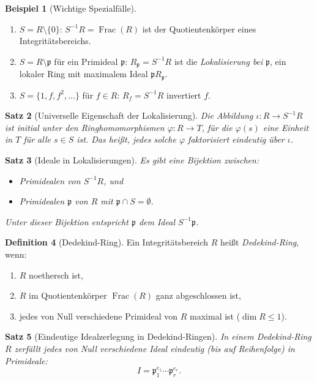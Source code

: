 \documentclass[12pt,a4paper]{amsart}
\newtheorem{theorem}{Satz}[section]
\theoremstyle{definition}
\newtheorem{definition}[theorem]{Definition}
\newtheorem{example}[theorem]{Beispiel}
\theoremstyle{definition}
\DeclareMathOperator{\Frac}{Frac}
\begin{document}
\begin{example}[Wichtige Spezialfälle]
\begin{enumerate}[label=(\alph*)]
  \item $S = R \setminus \{0\}$: $S^{-1}R = \Frac(R)$ ist der Quotientenkörper eines
        Integritätsbereichs.
  \item $S = R \setminus \mathfrak{p}$ für ein Primideal $\mathfrak{p}$:
        $R_\mathfrak{p} = S^{-1}R$ ist die \emph{Lokalisierung bei} $\mathfrak{p}$,
        ein lokaler Ring mit maximalem Ideal $\mathfrak{p}R_\mathfrak{p}$.
  \item $S = \{1, f, f^2, \ldots\}$ für $f \in R$: $R_f = S^{-1}R$ invertiert $f$.
\end{enumerate}
\end{example}

\begin{theorem}[Universelle Eigenschaft der Lokalisierung]
Die Abbildung $\iota\colon R \to S^{-1}R$ ist initial unter den Ringhomomorphismen
$\varphi\colon R \to T$, für die $\varphi(s)$ eine Einheit in $T$ für alle $s \in S$
ist. Das heißt, jedes solche $\varphi$ faktorisiert eindeutig über $\iota$.
\end{theorem}

\begin{theorem}[Ideale in Lokalisierungen]
Es gibt eine Bijektion zwischen:
\begin{itemize}
  \item Primidealen von $S^{-1}R$, und
  \item Primidealen $\mathfrak{p}$ von $R$ mit $\mathfrak{p} \cap S = \emptyset$.
\end{itemize}
Unter dieser Bijektion entspricht $\mathfrak{p}$ dem Ideal $S^{-1}\mathfrak{p}$.
\end{theorem}

\begin{definition}[Dedekind-Ring]
Ein Integritätsbereich $R$ heißt \emph{Dedekind-Ring}, wenn:
\begin{enumerate}[label=(\roman*)]
  \item $R$ noethersch ist,
  \item $R$ im Quotientenkörper $\Frac(R)$ ganz abgeschlossen ist,
  \item jedes von Null verschiedene Primideal von $R$ maximal ist ($\dim R \leq 1$).
\end{enumerate}
\end{definition}

\begin{theorem}[Eindeutige Idealzerlegung in Dedekind-Ringen]
In einem Dedekind-Ring $R$ zerfällt jedes von Null verschiedene Ideal eindeutig
(bis auf Reihenfolge) in Primideale:
\[
  I = \mathfrak{p}_1^{e_1} \cdots \mathfrak{p}_r^{e_r}.
\]
\end{theorem}
\end{document}
